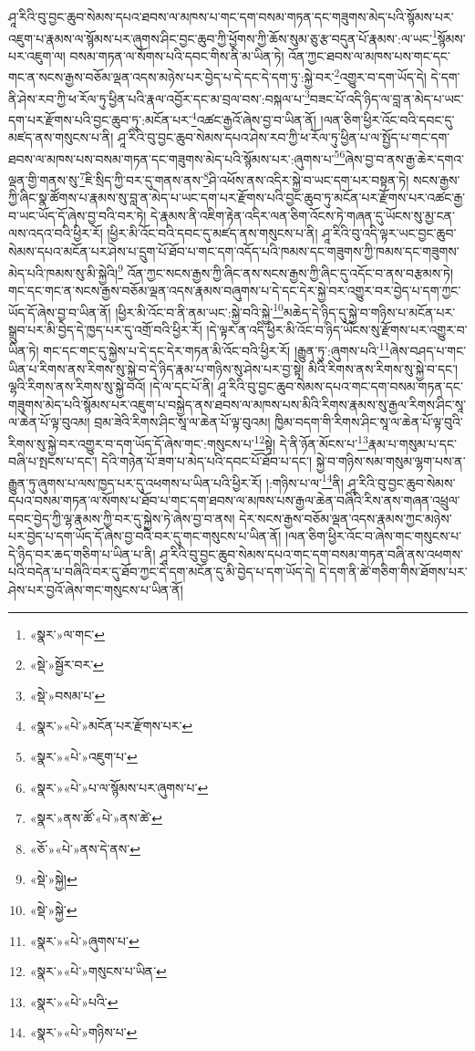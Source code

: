 ཤཱ་རིའི་བུ་བྱང་ཆུབ་སེམས་དཔའ་ཐབས་ལ་མཁས་པ་གང་དག་བསམ་གཏན་དང་གཟུགས་མེད་པའི་སྙོམས་པར་འཇུག་པ་རྣམས་ལ་སྙོམས་པར་ཞུགས་ཤིང་བྱང་ཆུབ་ཀྱི་ཕྱོགས་ཀྱི་ཆོས་སུམ་ཅུ་རྩ་བདུན་པོ་རྣམས་:ལ་ཡང་\footnote{«སྣར་»ལ་གང་}སྙོམས་པར་འཇུག་ལ། བསམ་གཏན་ལ་སོགས་པའི་དབང་གིས་ནི་མ་ཡིན་ཏེ། འོན་ཀྱང་ཐབས་ལ་མཁས་པས་གང་དང་གང་ན་སངས་རྒྱས་བཅོམ་ལྡན་འདས་མཉེས་པར་བྱེད་པ་དེ་དང་དེ་དག་ཏུ་:སྐྱེ་བར་\footnote{«སྡེ་»སྦྱོར་བར་}འགྱུར་བ་དག་ཡོད་དེ། དེ་དག་ནི་ཤེས་རབ་ཀྱི་ཕ་རོལ་ཏུ་ཕྱིན་པའི་རྣལ་འབྱོར་དང་མ་བྲལ་བས་:བསྐལ་པ་\footnote{«སྡེ་»བསམ་པ་}བཟང་པོ་འདི་ཉིད་ལ་བླ་ན་མེད་པ་ཡང་དག་པར་རྫོགས་པའི་བྱང་ཆུབ་ཏུ་:མངོན་པར་\footnote{«སྣར་»«པེ་»མངོན་པར་རྫོགས་པར་}འཚང་རྒྱའོ་ཞེས་བྱ་བ་ཡིན་ནོ། །ལན་ཅིག་ཕྱིར་འོང་བའི་དབང་དུ་མཛད་ནས་གསུངས་པ་ནི། ཤཱ་རིའི་བུ་བྱང་ཆུབ་སེམས་དཔའ་ཤེས་རབ་ཀྱི་ཕ་རོལ་ཏུ་ཕྱིན་པ་ལ་སྤྱོད་པ་གང་དག་ཐབས་ལ་མཁས་པས་བསམ་གཏན་དང་གཟུགས་མེད་པའི་སྙོམས་པར་:ཞུགས་པ་\footnote{«སྣར་»«པེ་»འཇུག་པ་}\footnote{«སྣར་»«པེ་»པ་ལ་སྙོམས་པར་ཞུགས་པ་}ཞེས་བྱ་བ་ནས་རྒྱ་ཆེར་དགའ་ལྡན་གྱི་གནས་སུ་\footnote{«སྣར་»ནས་ཚོ་«པེ་»ནས་ཚེ་}ཇི་སྲིད་ཀྱི་བར་དུ་གནས་ནས་\footnote{«ཅོ་»«པེ་»ནས་དེ་ནས་}ཤི་འཕོས་ནས་འདིར་སྐྱེ་བ་ཡང་དག་པར་བསྟན་ཏེ། སངས་རྒྱས་ཀྱི་ཞིང་སྣ་ཚོགས་པ་རྣམས་སུ་བླ་ན་མེད་པ་ཡང་དག་པར་རྫོགས་པའི་བྱང་ཆུབ་ཏུ་མངོན་པར་རྫོགས་པར་འཚང་རྒྱ་བ་ཡང་ཡོད་དོ་ཞེས་བྱ་བའི་བར་ཏེ། དེ་རྣམས་ནི་འཇིག་རྟེན་འདིར་ལན་ཅིག་འོངས་ཏེ་གཞན་དུ་ཡོངས་སུ་མྱ་ངན་ལས་འདའ་བའི་ཕྱིར་རོ། །ཕྱིར་མི་འོང་བའི་དབང་དུ་མཛད་ནས་གསུངས་པ་ནི། ཤཱ་རིའི་བུ་འདི་ལྟར་ཡང་བྱང་ཆུབ་སེམས་དཔའ་མངོན་པར་ཤེས་པ་དྲུག་པོ་ཐོབ་པ་གང་དག་འདོད་པའི་ཁམས་དང་གཟུགས་ཀྱི་ཁམས་དང་གཟུགས་མེད་པའི་ཁམས་སུ་མི་སྐྱེའི།\footnote{«སྡེ་»སྐྱེ།} འོན་ཀྱང་སངས་རྒྱས་ཀྱི་ཞིང་ནས་སངས་རྒྱས་ཀྱི་ཞིང་དུ་འདོང་བ་ནས་བརྩམས་ཏེ། གང་དང་གང་ན་སངས་རྒྱས་བཅོམ་ལྡན་འདས་རྣམས་བཞུགས་པ་དེ་དང་དེར་སྐྱེ་བར་འགྱུར་བར་བྱེད་པ་དག་ཀྱང་ཡོད་དོ་ཞེས་བྱ་བ་ཡིན་ནོ། །ཕྱིར་མི་འོང་བ་ནི་ནམ་ཡང་:སྐྱེ་བའི་སྐྱེ་\footnote{«སྡེ་»སྐྱེ་}མཆེད་དེ་ཉིད་དུ་སྐྱེ་བ་གཉིས་པ་མངོན་པར་སྒྲུབ་པར་མི་བྱེད་དེ་ཁྱད་པར་དུ་འགྲོ་བའི་ཕྱིར་རོ། །དེ་ལྟར་ན་འདི་ཕྱིར་མི་འོང་བ་ཉིད་ཡོངས་སུ་རྫོགས་པར་འགྱུར་བ་ཡིན་ཏེ། གང་དང་གང་དུ་སྐྱེས་པ་དེ་དང་དེར་གཏན་མི་འོང་བའི་ཕྱིར་རོ། །རྒྱུན་ཏུ་:ཞུགས་པའི་\footnote{«སྣར་»«པེ་»ཞུགས་པ་}ཞེས་བཤད་པ་གང་ཡིན་པ་རིགས་ནས་རིགས་སུ་སྐྱེ་བ་དེ་ཉིད་རྣམ་པ་གཉིས་སུ་ཤེས་པར་བྱ་སྟེ། མིའི་རིགས་ནས་རིགས་སུ་སྐྱེ་བ་དང་། ལྷའི་རིགས་ནས་རིགས་སུ་སྐྱེ་བའོ། །དེ་ལ་དང་པོ་ནི། ཤཱ་རིའི་བུ་བྱང་ཆུབ་སེམས་དཔའ་གང་དག་བསམ་གཏན་དང་གཟུགས་མེད་པའི་སྙོམས་པར་འཇུག་པ་བསྐྱེད་ནས་ཐབས་ལ་མཁས་པས་མིའི་རིགས་རྣམས་སུ་རྒྱལ་རིགས་ཤིང་སཱ་ལ་ཆེན་པོ་ལྟ་བུའམ། བྲམ་ཟེའི་རིགས་ཤིང་སཱ་ལ་ཆེན་པོ་ལྟ་བུའམ། ཁྱིམ་བདག་གི་རིགས་ཤིང་སཱ་ལ་ཆེན་པོ་ལྟ་བུའི་རིགས་སུ་སྐྱེ་བར་འགྱུར་བ་དག་ཡོད་དོ་ཞེས་གང་:གསུངས་པ་\footnote{«སྣར་»«པེ་»གསུངས་པ་ཡིན་}སྟེ། དེ་ནི་ཉོན་མོངས་པ་\footnote{«སྣར་»«པེ་»པའི་}རྣམ་པ་གསུམ་པ་དང་བཞི་པ་སྤངས་པ་དང་། དེའི་གཉེན་པོ་ཟག་པ་མེད་པའི་དབང་པོ་ཐོབ་པ་དང་། སྐྱེ་བ་གཉིས་སམ་གསུམ་ལྷག་པས་ན་རྒྱུན་ཏུ་ཞུགས་པ་ལས་ཁྱད་པར་དུ་འཕགས་པ་ཡིན་པའི་ཕྱིར་རོ། །:གཉིས་པ་ལ་\footnote{«སྣར་»«པེ་»གཉིས་པ་}ནི། ཤཱ་རིའི་བུ་བྱང་ཆུབ་སེམས་དཔའ་བསམ་གཏན་ལ་སོགས་པ་ཐོབ་པ་གང་དག་ཐབས་ལ་མཁས་པས་རྒྱལ་ཆེན་བཞིའི་རིས་ནས་གཞན་འཕྲུལ་དབང་བྱེད་ཀྱི་ལྷ་རྣམས་ཀྱི་བར་དུ་སྐྱེས་ཏེ་ཞེས་བྱ་བ་ནས། དེར་སངས་རྒྱས་བཅོམ་ལྡན་འདས་རྣམས་ཀྱང་མཉེས་པར་བྱེད་པ་དག་ཡོད་དོ་ཞེས་བྱ་བའི་བར་དུ་གང་གསུངས་པ་ཡིན་ནོ། །ལན་ཅིག་ཕྱིར་འོང་བ་ཞེས་གང་གསུངས་པ་དེ་ཉིད་བར་ཆད་གཅིག་པ་ཡིན་པ་ནི། ཤཱ་རིའི་བུ་བྱང་ཆུབ་སེམས་དཔའ་གང་དག་བསམ་གཏན་བཞི་ནས་འཕགས་པའི་བདེན་པ་བཞིའི་བར་དུ་ཐོབ་ཀྱང་དེ་དག་མངོན་དུ་མི་བྱེད་པ་དག་ཡོད་དེ། དེ་དག་ནི་ཚེ་གཅིག་གིས་ཐོགས་པར་ཤེས་པར་བྱའོ་ཞེས་གང་གསུངས་པ་ཡིན་ནོ། 